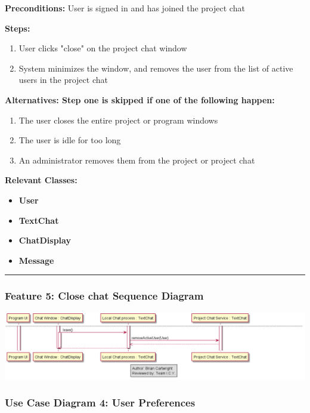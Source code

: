 \documentclass[twoside,letterpaper]{article}
\begin{document}
\noindent\textbf{Preconditions:} User is signed in and has joined the project chat \newline

\noindent\textbf{Steps:} \begin{enumerate}
	\item User clicks "close" on the project chat window
	\item System minimizes the window, and removes the user from the list of active users in the project chat
\end{enumerate}
\noindent\textbf{Alternatives: Step one is skipped if one of the following happen: }
\begin{enumerate}
	\item The user closes the entire project or program windows
	\item The user is idle for too long
	\item An administrator removes them from the project or project chat
\end{enumerate}


\noindent\textbf{Relevant Classes:}
\begin{itemize}
	\item \textbf{User}
	\item \textbf{TextChat}
	\item \textbf{ChatDisplay}
	\item \textbf{Message}
\end{itemize}
\hrule
\newpage

\subsubsection[Communication Feature 5: Close chat Sequence Diagram]{\rmfamily\bfseries\color{black}
	Feature 5: Close chat Sequence Diagram}
\hypertarget{RefHeading22059017292}{}

\bigskip

\includegraphics[width=\textwidth]{images/SequenceDiagrams/Comms_CloseProjectChat}

\newpage

\subsubsection[Use Case Diagram 4: User Preferences]{\rmfamily\bfseries\color{black}
	Use Case Diagram 4: User Preferences}
\end{document}
